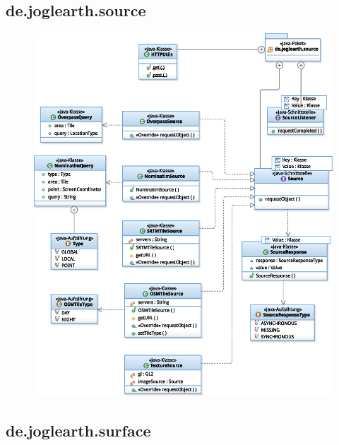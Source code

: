 \documentclass[10pt]{scrreprt}
\begin{document}
\newpage



\subsection*{de.joglearth.source}

\begin{figure}[!htb]
\begin{center}
	\includegraphics[scale=0.55]{de_joglearth_source.eps}
\end{center}
\end{figure}

\newpage

\subsection*{de.joglearth.surface}
\end{document}
